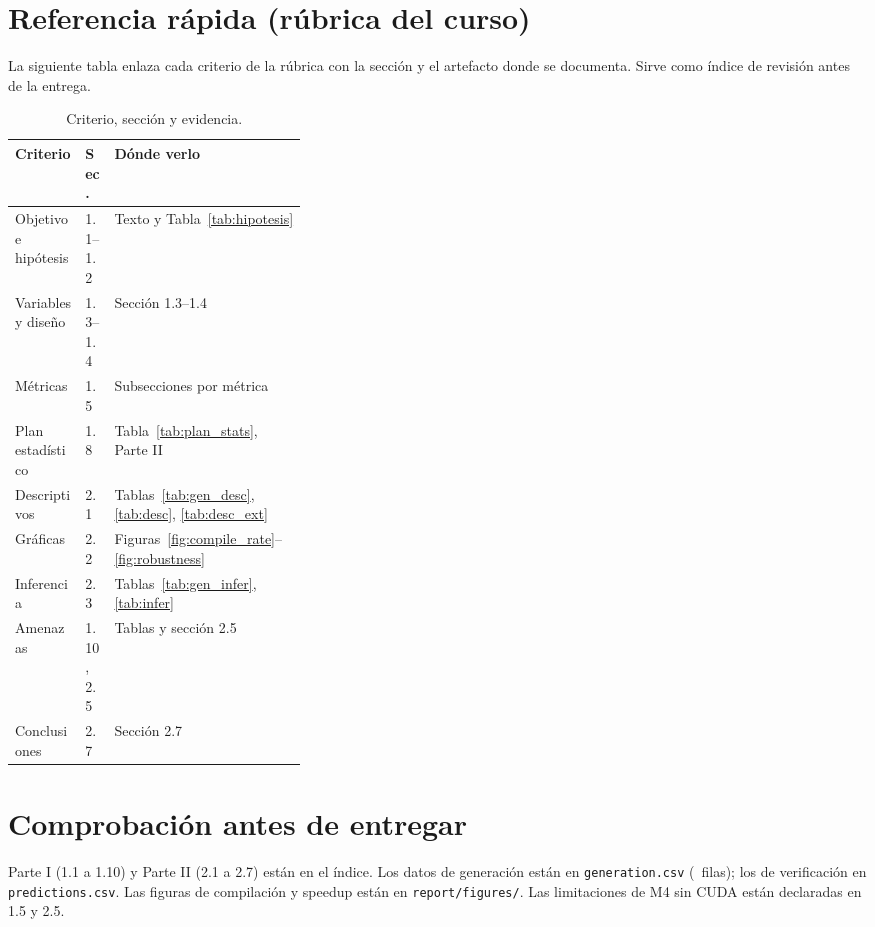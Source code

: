 \section{Referencia rápida (rúbrica del curso)}

La siguiente tabla enlaza cada criterio de la rúbrica con la sección y el artefacto donde se documenta. Sirve como índice de revisión antes de la entrega.

\begin{table}[ht]
\centering
\caption{Criterio, sección y evidencia.}
\label{tab:matriz_rubrica}
\scriptsize
\begin{adjustbox}{max width=\linewidth,center}
\begin{tabularx}{\linewidth}{@{}p{0.24\linewidth}p{0.1\linewidth}X@{}}
\toprule
Criterio & Sec. & Dónde verlo \\
\midrule
Objetivo e hipótesis & 1.1--1.2 & Texto y Tabla~\ref{tab:hipotesis} \\
Variables y diseño & 1.3--1.4 & Sección 1.3--1.4 \\
Métricas & 1.5 & Subsecciones por métrica \\
Plan estadístico & 1.8 & Tabla~\ref{tab:plan_stats}, Parte II \\
Descriptivos & 2.1 & Tablas~\ref{tab:gen_desc}, \ref{tab:desc}, \ref{tab:desc_ext} \\
Gráficas & 2.2 & Figuras~\ref{fig:compile_rate}--\ref{fig:robustness} \\
Inferencia & 2.3 & Tablas~\ref{tab:gen_infer}, \ref{tab:infer} \\
Amenazas & 1.10, 2.5 & Tablas y sección 2.5 \\
Conclusiones & 2.7 & Sección 2.7 \\
\bottomrule
\end{tabularx}
\end{adjustbox}
\end{table}

\section{Comprobación antes de entregar}

Parte I (1.1 a 1.10) y Parte II (2.1 a 2.7) están en el índice. Los datos de generación están en \texttt{generation.csv} (\Ngen\ filas); los de verificación en \texttt{predictions.csv}. Las figuras de compilación y speedup están en \texttt{report/figures/}. Las limitaciones de M4 sin CUDA están declaradas en 1.5 y 2.5.
